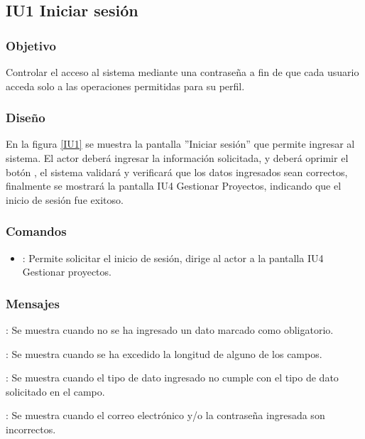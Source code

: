 \subsection{IU1 Iniciar sesión}

\subsubsection{Objetivo}
	Controlar el acceso al sistema mediante una contraseña a fin de que cada usuario acceda solo a las operaciones permitidas para su perfil.

\subsubsection{Diseño}
	En la figura \ref{IU1} se muestra la pantalla ''Iniciar sesión'' que permite ingresar al sistema. El actor deberá ingresar la información solicitada, y deberá oprimir el botón , el sistema validará y verificará que los datos ingresados sean correctos, finalmente se mostrará la pantalla IU4 Gestionar Proyectos, indicando que el inicio de sesión fue exitoso.

\label{IU1}
\subsubsection{Comandos}
\begin{itemize}
	\item {}: Permite solicitar el inicio de sesión, dirige al actor a la pantalla IU4 Gestionar proyectos.
\end{itemize}

\subsubsection{Mensajes}

\begin{Citemize}
	\item {}: Se muestra cuando no se ha ingresado un dato marcado como obligatorio.
	\item {}: Se muestra cuando se ha excedido la longitud de alguno de los campos.
	\item {}: Se muestra cuando el tipo de dato ingresado no cumple con el tipo de dato solicitado en el campo.
	\item {}: Se muestra cuando el correo electrónico y/o la contraseña ingresada son incorrectos.
\end{Citemize}


